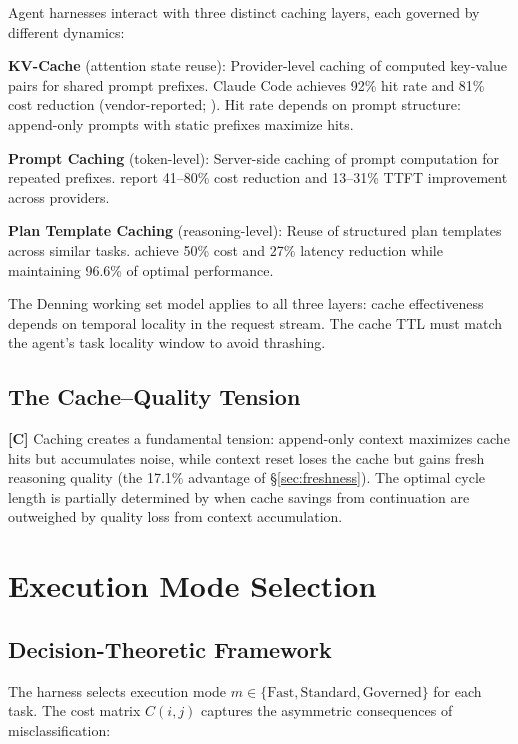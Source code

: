 \documentclass[11pt, a4paper, logo, copyright]{googledeepmind}
\begin{document}
Agent harnesses interact with three distinct caching layers, each governed by different dynamics:

\textbf{KV-Cache} (attention state reuse): Provider-level caching of computed key-value pairs for shared prompt prefixes. Claude Code achieves 92\% hit rate and 81\% cost reduction (vendor-reported; \citealt{anthropic2026agentic}). Hit rate depends on prompt structure: append-only prompts with static prefixes maximize hits.

\textbf{Prompt Caching} (token-level): Server-side caching of prompt computation for repeated prefixes. \citet{liang2026cache} report 41--80\% cost reduction and 13--31\% TTFT improvement across providers.

\textbf{Plan Template Caching} (reasoning-level): Reuse of structured plan templates across similar tasks. \citet{zhang2025apc} achieve 50\% cost and 27\% latency reduction while maintaining 96.6\% of optimal performance.

The Denning working set model \citep{denning1968working} applies to all three layers: cache effectiveness depends on temporal locality in the request stream. The cache TTL must match the agent's task locality window to avoid thrashing.

\subsection{The Cache--Quality Tension}

\textbf{[C]} Caching creates a fundamental tension: append-only context maximizes cache hits but accumulates noise, while context reset loses the cache but gains fresh reasoning quality (the 17.1\% advantage of \S\ref{sec:freshness}). The optimal cycle length is partially determined by when cache savings from continuation are outweighed by quality loss from context accumulation.


\section{Execution Mode Selection}\label{sec:modes}

\subsection{Decision-Theoretic Framework}

The harness selects execution mode $m \in \{\text{Fast}, \text{Standard}, \text{Governed}\}$ for each task. The cost matrix $C(i,j)$ captures the asymmetric consequences of misclassification:
\end{document}
